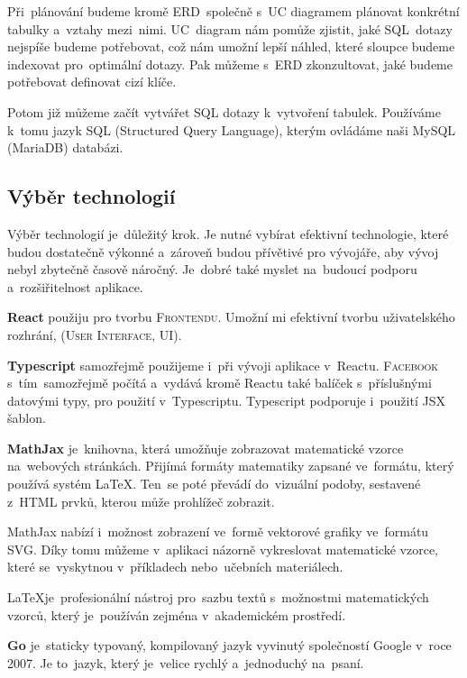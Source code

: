 \documentclass[14pt,a4paper]{article}
\begin{document}
        Při~plánování budeme kromě ERD~společně s~UC diagramem plánovat konkrétní tabulky a~vztahy mezi~nimi. UC~diagram nám pomůže zjistit, jaké SQL~dotazy nejspíše budeme potřebovat, což nám umožní lepší náhled, které sloupce budeme indexovat pro~optimální dotazy.
        Pak můžeme s~ERD zkonzultovat, jaké budeme potřebovat definovat cizí klíče.

        Potom již můžeme začít vytvářet SQL dotazy k~vytvoření tabulek. Používáme k~tomu jazyk \textsc{SQL} (Structured Query Language), kterým ovládáme naši MySQL (MariaDB) databázi.

        \subsection{Výběr technologií}
            Výběr technologií je~důležitý krok. Je nutné vybírat efektivní technologie, které budou dostatečně výkonné a~zároveň budou
            přívětivé pro vývojáře, aby vývoj nebyl zbytečně časově náročný. Je~dobré také myslet na~budoucí podporu a~rozšiřitelnost aplikace.

            \textbf{React} použiju pro tvorbu \textsc{Frontendu}. Umožní mi efektivní tvorbu uživatelského rozhrání, (\textsc{User Interface, UI}).

            \textbf{Typescript} samozřejmě použijeme i~při vývoji aplikace v~Reactu. \textsc{Facebook} s~tím~samozřejmě počítá a~vydává
            kromě Reactu také balíček s~příslušnými datovými typy, pro použití v~Typescriptu. Typescript podporuje i~použití JSX šablon. \parencite[Refeerence/Handbook/JSX]{TypeScript}

            \textbf{MathJax} je~knihovna, která umožňuje zobrazovat matematické vzorce na~webových stránkách.
            Přijímá formáty matematiky zapsané ve~formátu, který používá systém \LaTeX. Ten~se poté převádí do~vizuální podoby, sestavené z~HTML prvků, kterou může prohlížeč zobrazit.
            
            MathJax nabízí i~možnost zobrazení ve~formě vektorové grafiky ve~formátu SVG.
            Díky tomu můžeme v~aplikaci názorně vykreslovat matematické vzorce, které se~vyskytnou v~příkladech nebo~učebních materiálech.\parencite{abclinuxuMatematickxE9Vzorce}

            \LaTeX je~profesionální nástroj pro~sazbu textů s~možnostmi matematických vzorců, který je~používán zejména v~akademickém prostředí.\parencite{Rybicka2003:latex}

            \textbf{Go} je~staticky typovaný, kompilovaný jazyk vyvinutý společností Google v~roce 2007. Je to~jazyk, který je~velice rychlý a~jednoduchý na~psaní.
\end{document}
